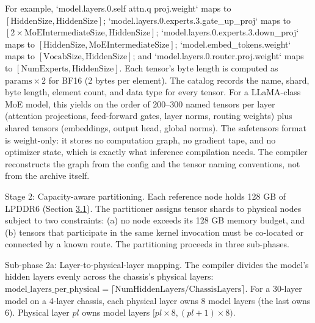 \documentclass[10pt,twocolumn]{article}
\begin{document}
For example, `model.layers.0.self attn.q proj.weight` maps to $[\mathrm{HiddenSize}, \mathrm{HiddenSize}]$; `model.layers.0.experts.3.gate\_up\_proj` maps to $[2 \times \mathrm{MoEIntermediateSize}, \mathrm{HiddenSize}]$; `model.layers.0.experts.3.down\_proj` maps to $[\mathrm{HiddenSize}, \mathrm{MoEIntermediateSize}]$; `model.embed\_tokens.weight` maps to $[\mathrm{VocabSize}, \mathrm{HiddenSize}]$; and `model.layers.0.router.proj.weight` maps to $[\mathrm{NumExperts}, \mathrm{HiddenSize}]$. Each tensor's byte length is computed as $\mathrm{params} \times 2$ for BF16 (2 bytes per element). The catalog records the name, shard, byte length, element count, and data type for every tensor. For a LLaMA-class MoE model, this yields on the order of 200--300 named tensors per layer (attention projections, feed-forward gates, layer norms, routing weights) plus shared tensors (embeddings, output head, global norms). The safetensors format is weight-only: it stores no computation graph, no gradient tape, and no optimizer state, which is exactly what inference compilation needs. The compiler reconstructs the graph from the config and the tensor naming conventions, not from the archive itself.

Stage 2: Capacity-aware partitioning. Each reference node holds 128 GB of LPDDR6 (Section \hyperref[sec:3.1]{3.1}). The partitioner assigns tensor shards to physical nodes subject to two constraints: (a) no node exceeds its 128 GB memory budget, and (b) tensors that participate in the same kernel invocation must be co-located or connected by a known route. The partitioning proceeds in three sub-phases.

Sub-phase 2a: Layer-to-physical-layer mapping. The compiler divides the model's hidden layers evenly across the chassis's physical layers: $\mathrm{model\_layers\_per\_physical} = \lceil \mathrm{NumHiddenLayers} / \mathrm{ChassisLayers} \rceil$. For a 30-layer model on a 4-layer chassis, each physical layer owns 8 model layers (the last owns 6). Physical layer $pl$ owns model layers $[pl \times 8, (pl+1) \times 8)$.
\end{document}
